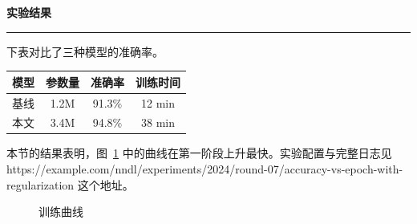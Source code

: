 \documentclass[UTF8,11pt]{ctexart}
\begin{document}
\begin{center}
{\LARGE\bfseries 实验结果}\\[2pt]
\rule{\linewidth}{0.4pt}   %
\end{center}

\vspace{6pt}
下表对比了三种模型的准确率。

\begin{center}
\begin{tabular}{|c|c|c|c|}   %
\hline
模型 & 参数量 & 准确率 & 训练时间 \\
\hline
基线 & 1.2M & 91.3\% & 12 min \\
\hline
本文 & 3.4M & 94.8\% & 38 min \\
\hline
\end{tabular}
\end{center}

本节的结果表明，图~\ref{fig:curve} 中的曲线在第一阶段上升最快。实验配置与完整日志见 https://example.com/nndl/experiments/2024/round-07/accuracy-vs-epoch-with-regularization 这个地址。

\begin{figure}[htbp]
\centering
{}\caption{训练曲线}\label{fig:curve}
\end{figure}
\end{document}
